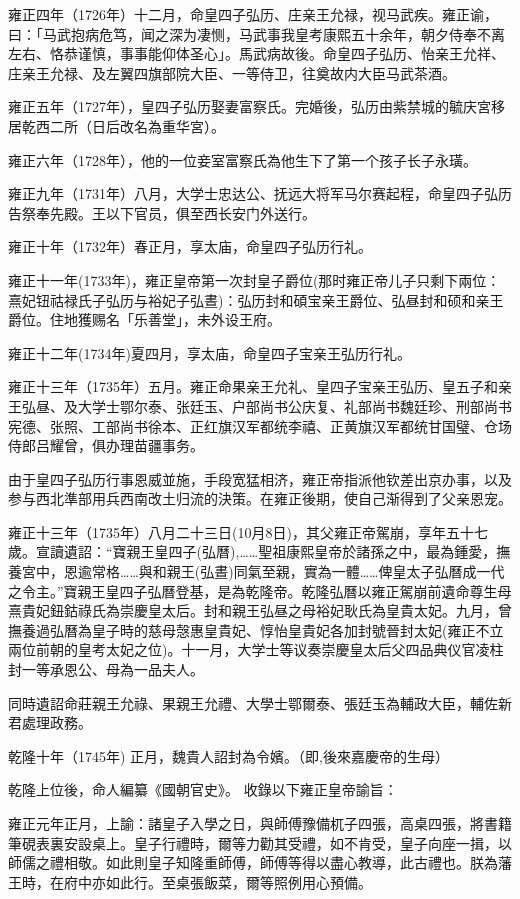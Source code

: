 雍正四年（1726年）十二月，命皇四子弘历、庄亲王允禄，视马武疾。雍正谕，曰：「马武抱病危笃，闻之深为凄恻，马武事我皇考康熙五十余年，朝夕侍奉不离左右、恪恭谨慎，事事能仰体圣心」。馬武病故後。命皇四子弘历、怡亲王允祥、庄亲王允禄、及左翼四旗部院大臣、一等侍卫，往奠故内大臣马武茶酒。

雍正五年（1727年），皇四子弘历娶妻富察氏。完婚後，弘历由紫禁城的毓庆宮移居乾西二所（日后改名為重华宮）。

雍正六年（1728年），他的一位妾室富察氏為他生下了第一个孩子长子永璜。

雍正九年（1731年）八月，大学士忠达公、抚远大将军马尔赛起程，命皇四子弘历告祭奉先殿。王以下官员，俱至西长安门外送行。

雍正十年（1732年）春正月，享太庙，命皇四子弘历行礼。

雍正十一年(1733年)，雍正皇帝第一次封皇子爵位(那时雍正帝儿子只剩下兩位：熹妃钮祜禄氏子弘历与裕妃子弘晝)：弘历封和碩宝亲王爵位、弘昼封和硕和亲王爵位。住地獲赐名「乐善堂」，未外设王府。

雍正十二年(1734年)夏四月，享太庙，命皇四子宝亲王弘历行礼。

雍正十三年（1735年）五月。雍正命果亲王允礼、皇四子宝亲王弘历、皇五子和亲王弘昼、及大学士鄂尔泰、张廷玉、户部尚书公庆复、礼部尚书魏廷珍、刑部尚书宪德、张照、工部尚书徐本、正红旗汉军都统李禧、正黄旗汉军都统甘国璧、仓场侍郎吕耀曾，俱办理苗疆事务。

由于皇四子弘历行事恩威並施，手段宽猛相济，雍正帝指派他钦差出京办事，以及参与西北準部用兵西南改土归流的決策。在雍正後期，使自己渐得到了父亲恩宠。

雍正十三年（1735年）八月二十三日(10月8日)，其父雍正帝駕崩，享年五十七歲。宣讀遺詔：“寶親王皇四子(弘曆),……聖祖康熙皇帝於諸孫之中，最為鍾愛，撫養宮中，恩逾常格……與和親王(弘晝)同氣至親，實為一體……俾皇太子弘曆成一代之令主。”寶親王皇四子弘曆登基，是為乾隆帝。乾隆弘曆以雍正駕崩前遺命尊生母熹貴妃鈕鈷祿氏為崇慶皇太后。封和親王弘昼之母裕妃耿氏為皇貴太妃。九月，曾撫養過弘曆為皇子時的慈母愨惠皇貴妃、惇怡皇貴妃各加封號晉封太妃(雍正不立兩位前朝的皇考太妃之位)。十一月，大学士等议奏崇慶皇太后父四品典仪官凌柱封一等承恩公、母為一品夫人。

同時遺詔命莊親王允祿、果親王允禮、大學士鄂爾泰、張廷玉為輔政大臣，輔佐新君處理政務。

乾隆十年（1745年) 正月，魏貴人詔封為令嬪。（即,後來嘉慶帝的生母）

乾隆上位後，命人編纂《國朝官史》。 收錄以下雍正皇帝諭旨：

雍正元年正月，上諭：諸皇子入學之日，與師傅豫備杌子四張，高桌四張，將書籍筆硯表裏安設桌上。皇子行禮時，爾等力勸其受禮，如不肯受，皇子向座一揖，以師儒之禮相敬。如此則皇子知隆重師傅，師傅等得以盡心教導，此古禮也。朕為藩王時，在府中亦如此行。至桌張飯菜，爾等照例用心預備。

